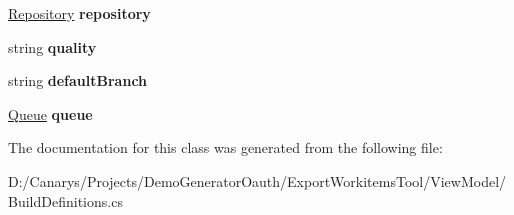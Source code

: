 \begin{DoxyCompactItemize}
\mbox{\hyperlink{class_templates_generator_tool_1_1_view_model_1_1_build_definitions_1_1_repository}{Repository}} {\bfseries repository}
\item 
\mbox{\label{class_templates_generator_tool_1_1_view_model_1_1_build_definitions_1_1_build_definition_ad0f6944604c181ebbe0f6ec3dc43a119}} 
string {\bfseries quality}
\item 
\mbox{\label{class_templates_generator_tool_1_1_view_model_1_1_build_definitions_1_1_build_definition_a80e92955ff039b383a117f4c07f88652}} 
string {\bfseries default\+Branch}
\item 
\mbox{\label{class_templates_generator_tool_1_1_view_model_1_1_build_definitions_1_1_build_definition_ada92aaf7feae5285cd9931b944db071d}} 
\mbox{\hyperlink{class_templates_generator_tool_1_1_view_model_1_1_build_definitions_1_1_queue}{Queue}} {\bfseries queue}
\end{DoxyCompactItemize}


The documentation for this class was generated from the following file\+:\begin{DoxyCompactItemize}
\item 
D\+:/\+Canarys/\+Projects/\+Demo\+Generator\+Oauth/\+Export\+Workitems\+Tool/\+View\+Model/Build\+Definitions.\+cs\end{DoxyCompactItemize}
